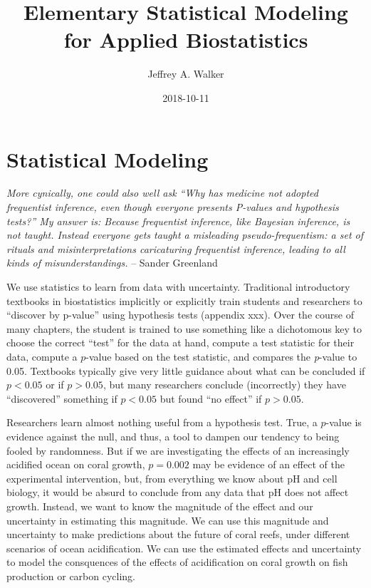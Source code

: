 \documentclass[]{book}
\title{Elementary Statistical Modeling for Applied Biostatistics}
\author{Jeffrey A. Walker}
\date{2018-10-11}
\theoremstyle{definition}
\theoremstyle{definition}
\theoremstyle{definition}
\theoremstyle{remark}
\begin{document}
\maketitle

{
\setcounter{tocdepth}{1}
\tableofcontents
}
\chapter{Statistical Modeling}\label{statistical-modeling}

\emph{More cynically, one could also well ask ``Why has medicine not
adopted frequentist inference, even though everyone presents P-values
and hypothesis tests?'' My answer is: Because frequentist inference,
like Bayesian inference, is not taught. Instead everyone gets taught a
misleading pseudo-frequentism: a set of rituals and misinterpretations
caricaturing frequentist inference, leading to all kinds of
misunderstandings.} -- Sander Greenland

We use statistics to learn from data with uncertainty. Traditional
introductory textbooks in biostatistics implicitly or explicitly train
students and researchers to ``discover by p-value'' using hypothesis
tests (appendix xxx). Over the course of many chapters, the student is
trained to use something like a dichotomous key to choose the correct
``test'' for the data at hand, compute a test statistic for their data,
compute a \(p\)-value based on the test statistic, and compares the
\emph{p}-value to 0.05. Textbooks typically give very little guidance
about what can be concluded if \(p < 0.05\) or if \(p > 0.05\), but many
researchers conclude (incorrectly) they have ``discovered'' something if
\(p < 0.05\) but found ``no effect'' if \(p > 0.05\).

Researchers learn almost nothing useful from a hypothesis test. True, a
\(p\)-value is evidence against the null, and thus, a tool to dampen our
tendency to being fooled by randomness. But if we are investigating the
effects of an increasingly acidified ocean on coral growth, \(p=0.002\)
may be evidence of an effect of the experimental intervention, but, from
everything we know about pH and cell biology, it would be absurd to
conclude from any data that pH does not affect growth. Instead, we want
to know the magnitude of the effect and our uncertainty in estimating
this magnitude. We can use this magnitude and uncertainty to make
predictions about the future of coral reefs, under different scenarios
of ocean acidification. We can use the estimated effects and uncertainty
to model the consquences of the effects of acidification on coral growth
on fish production or carbon cycling.
\end{document}
